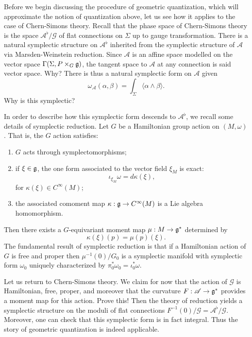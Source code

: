 \documentclass{amsart}
\begin{document}
Before we begin discussing the procedure of geometric quantization, which will approximate the
notion of quantization above, let us see how it applies to the case of Chern-Simons theory.
Recall that the phase space of Chern-Simons theory is the space $\mathscr{A}^\flat/\mathscr{G}$
of flat connections on $\Sigma$ up to gauge transformation. There is a natural symplectic structure on
$\mathscr{A}^\flat$ inherited from the symplectic structure of $\mathscr{A}$ via Marsden-Weinstein reduction.
Since $\mathscr{A}$ is an affine space modelled on the vector space $\Gamma(\Sigma,P\times_G\mathfrak g)$, the
tangent space to $\mathscr{A}$ at any connection is said vector space. {\color{red} Why?}
There is thus a natural symplectic form on $\mathscr{A}$ given
\begin{equation*}
    \omega_\mathscr{A}(\alpha,\beta) = \int_\Sigma \langle \alpha\wedge\beta\rangle.
\end{equation*}
{\color{red} Why is this symplectic?}

In order to describe how this symplectic form descends to $\mathscr{A}^\flat$, we recall some details
of symplectic reduction. Let $G$ be a Hamiltonian group action on $(M,\omega)$. That is, the $G$
action satisfies:
\begin{enumerate}
    \item $G$ acts through symplectomorphisms;
    \item if $\xi\in\mathfrak g$, the one form associated to the vector field $\xi_M$ is exact:
        \begin{equation*}
            \iota_{\xi_M}\omega = d\kappa(\xi),
        \end{equation*}
        for $\kappa(\xi)\in C^\infty(M)$;
    \item the associated comoment map $\kappa:\mathfrak g\to C^\infty(M)$ is a Lie algebra homomorphism.
\end{enumerate}
Then there exists a $G$-equivariant moment map $\mu:M\to\mathfrak g^*$ determined by
\begin{equation*}
    \kappa(\xi)(p) = \mu(p)(\xi).
\end{equation*}
The fundamental result of symplectic reduction is that if a Hamiltonian action of $G$ is free and proper
then $\mu^{-1}(0)/G_0$ is a symplectic manifold with symplectic form $\omega_0$ uniquely
characterized by $\pi_0^*\omega_0 = \iota_0^*\omega$.

Let us return to Chern-Simons theory. We claim for now that the action of $\mathscr{G}$ is Hamiltonian,
free, proper, and moreover that the curvature $F:\mathscr{A}\to\mathfrak g^*$ provides a moment map for this action.
{\color{red} Prove this!} Then the theory of reduction yields a symplectic structure on
the moduli of flat connections $F^{-1}(0)/\mathscr{G}=\mathscr{A}^\flat/\mathscr{G}$. Moreover,
one can check that this symplectic form is in fact integral. Thus the story of geometric quantization is
indeed applicable.
\end{document}
